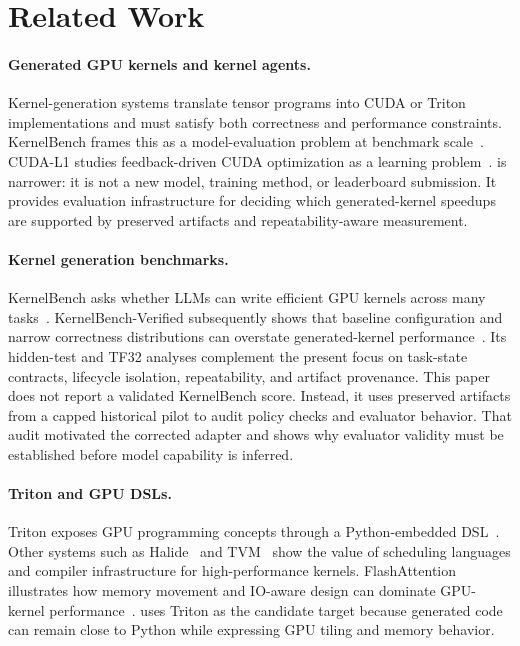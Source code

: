 \section{Related Work}

\paragraph{Generated GPU kernels and kernel agents.}
Kernel-generation systems translate tensor programs into CUDA or Triton implementations and must satisfy both correctness and performance constraints. KernelBench frames this as a model-evaluation problem at benchmark scale~\cite{kernelbench2025}. CUDA-L1 studies feedback-driven CUDA optimization as a learning problem~\cite{cudallm2025}. \okf{} is narrower: it is not a new model, training method, or leaderboard submission. It provides evaluation infrastructure for deciding which generated-kernel speedups are supported by preserved artifacts and repeatability-aware measurement.

\paragraph{Kernel generation benchmarks.}
KernelBench asks whether LLMs can write efficient GPU kernels across many tasks~\cite{kernelbench2025}. KernelBench-Verified subsequently shows that baseline configuration and narrow correctness distributions can overstate generated-kernel performance~\cite{zhang2026kernelbenchverified}. Its hidden-test and TF32 analyses complement the present focus on task-state contracts, lifecycle isolation, repeatability, and artifact provenance. This paper does not report a validated KernelBench score. Instead, it uses preserved artifacts from a capped historical pilot to audit policy checks and evaluator behavior. That audit motivated the corrected  adapter and shows why evaluator validity must be established before model capability is inferred.

\paragraph{Triton and GPU DSLs.}
Triton exposes GPU programming concepts through a Python-embedded DSL~\cite{tillet2019triton}. Other systems such as Halide~\cite{ragankelley2013halide} and TVM~\cite{chen2018tvm} show the value of scheduling languages and compiler infrastructure for high-performance kernels. FlashAttention illustrates how memory movement and IO-aware design can dominate GPU-kernel performance~\cite{dao2022flashattention}. \okf{} uses Triton as the candidate target because generated code can remain close to Python while expressing GPU tiling and memory behavior.


